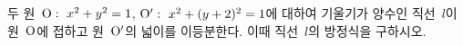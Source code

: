 두 원~$\mathrm{O}:\ x^2+y^2=1$, $\mathrm{O}':\ x^2+(y+2)^2=1$에 대하여 기울기가 양수인 직선~$l$이 원~$\mathrm{O}$에 접하고 원~$\mathrm{O}'$의 넓이를 이등분한다. 이때 직선~$l$의 방정식을 구하시오.
